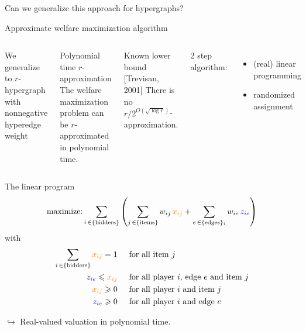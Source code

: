 \documentclass[aspectratio=169]{beamer}
\begin{document}
\begin{frame}[standout]
    Can we generalize this approach for \alert{hypergraphs}?
\end{frame}

\begin{frame}{Approximate welfare maximization algorithm}
    \begin{columns}
        We generalize to \(r\)-hypergraph with \alert{nonnegative hyperedge weight}

        \begin{block}{Polynomial time \(r\)-approximation}
            The welfare maximization problem can be \(r\)-approximated in polynomial time.
        \end{block}

        \begin{block}{Known lower bound [Trevisan, 2001]}
            There is no \(r/2^{O(\sqrt{\log r})}\)-approximation.
        \end{block}

        2 step algorithm:
        \begin{itemize}
            \item (real) linear programming
            \item randomized assignment
        \end{itemize}
    \end{columns}
\end{frame}

\begin{frame}{The linear program}
    \[
        \text{maximize:} \sum_{i \,\in \{\text{bidders}\}} \left(
        \sum_{j \,\in \{\text{items}\}} w_{ij}\, {\color{orange} x_{ij}}
        + \sum_{e \,\in \{\text{edges}\}_i} w_{ie}\, {\color{blue} z_{ie}}
        \right)
    \]
    with
    \begin{align*}
        \sum_{i \,\in \{\text{bidders}\}} {\color{orange} x_{ij}} = 1 & \hspace{.5cm} \text{for all item \(j\)}                              \\
        {\color{blue} z_{ie}} \leqslant {\color{orange} x_{ij}}       & \hspace{.5cm} \text{for all player \(i\), edge \(e\) and item \(j\)} \\
        {\color{orange} x_{ij}} \geqslant 0                           & \hspace{.5cm} \text{for all player \(i\) and item \(j\)}             \\
        {\color{blue} z_{ie}} \geqslant 0                             & \hspace{.5cm} \text{for all player \(i\) and edge \(e\)}
    \end{align*}

    $\hookrightarrow$ Real-valued valuation in \alert{polynomial time}.
\end{frame}
\end{document}

